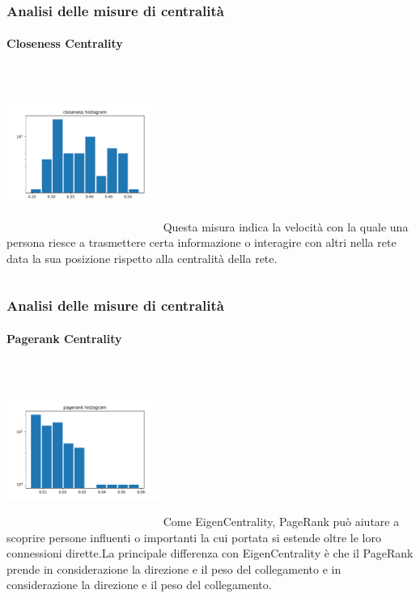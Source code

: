 \documentclass{beamer}
\begin{document}

\begin{frame}
\frametitle{Analisi delle misure di centralità}
\framesubtitle{Closeness Centrality}
\begin{columns}
             \centering
             \includegraphics[height=5cm, width=5cm]{misure_grafo/closeness.pdf}
             Questa misura indica la velocità con la quale una persona riesce a trasmettere certa informazione o interagire con altri nella rete data la sua posizione rispetto alla centralità della rete. 
         \end{columns} 

\end{frame}

\begin{frame}
\frametitle{Analisi delle misure di centralità}
\framesubtitle{Pagerank Centrality}
\begin{columns}
             \centering
             \includegraphics[height=5cm, width=5cm]{misure_grafo/pagerank.pdf}
       Come EigenCentrality, PageRank può aiutare a scoprire persone influenti o importanti la cui portata si estende oltre le loro connessioni dirette.La principale differenza con EigenCentrality è che il PageRank prende in considerazione la direzione e il peso del collegamento e in considerazione la direzione e il peso del collegamento.
         \end{columns} 

\end{frame}
\end{document}
